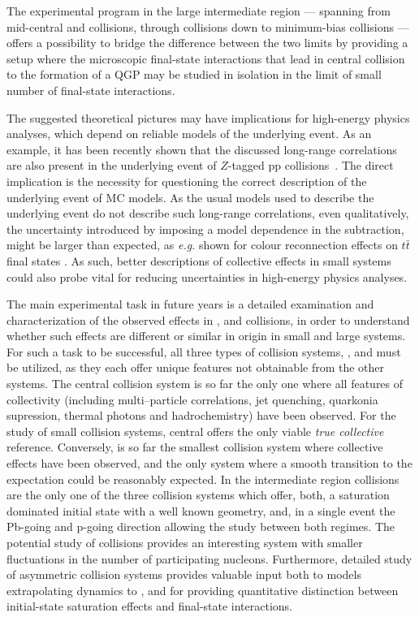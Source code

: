 \documentclass[../report.tex]{subfiles}
\begin{document}
The experimental program in the large intermediate region --- spanning from mid-central \PbPb and \XeXe collisions, through \pPb collisions down to minimum-bias \pp collisions --- offers a possibility to bridge the difference between the two limits by providing a setup where the microscopic final-state interactions that lead in central \PbPb collision to the formation of a QGP may be studied in isolation in the limit of small number of final-state interactions.

The suggested theoretical pictures may have implications for high-energy physics analyses, which depend on reliable models of the underlying event. As an example, it has been recently shown that the discussed long-range correlations are also present in the underlying event of $Z$-tagged pp collisions~\cite{ATLAS:2017nkt}. The direct implication is the necessity for questioning the correct description of the underlying event of MC models. As the usual models used to describe the underlying event do not describe such long-range correlations, even qualitatively, the uncertainty introduced by imposing a model dependence in the subtraction, might be larger than expected, as \textit{e.g.} shown for colour reconnection effects on $t\bar{t}$ final states \cite{Argyropoulos:2014zoa}. As such, better descriptions of collective effects in small systems could also probe vital for reducing uncertainties in high-energy physics analyses.

The main experimental task in future years is a detailed examination and characterization of the observed effects in \pp, \pPb and \PbPb collisions, in order to understand whether such effects are different or similar in origin in small and large systems. For such a task to be successful, all three types of collision systems, \pp, \pPb and \PbPb must be utilized, as they each offer unique features not obtainable from the other systems. The central \PbPb collision system is so far the only one where all features of collectivity (including multi--particle correlations, jet quenching, quarkonia supression, thermal photons and hadrochemistry) have been observed. For the study of small collision systems, central \PbPb offers the only viable \emph{true collective} reference. Conversely, \pp is so far the smallest collision system where collective effects have been observed, and the only system where a smooth transition to the \Pepem expectation could be reasonably expected. In the intermediate region \pPb collisions are the only one of the three collision systems which offer, both, a saturation dominated initial state with a well known geometry, and, in a single event the Pb-going and p-going direction allowing the study between both regimes.
The potential study of \OO collisions provides an interesting system with smaller fluctuations in the number of participating nucleons.
Furthermore, detailed study of asymmetric collision systems provides valuable input both to models extrapolating \pp dynamics to \PbPb, and for providing quantitative distinction between initial-state saturation effects and final-state interactions.
\end{document}

